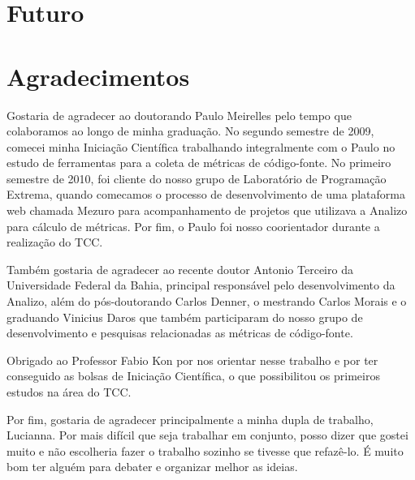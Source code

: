 \documentclass[a4paper, 11pt]{article}
\begin{document}
\section{Futuro}

\section{Agradecimentos}
Gostaria de agradecer ao doutorando Paulo Meirelles pelo tempo que colaboramos ao longo de minha graduação.
No segundo semestre de 2009, comecei minha Iniciação Científica trabalhando integralmente com o Paulo no
estudo de ferramentas para a coleta de métricas de código-fonte. No primeiro semestre de 2010, foi cliente
do nosso grupo de Laboratório de Programação Extrema, quando comecamos o processo de desenvolvimento de uma plataforma web 
chamada Mezuro para acompanhamento de projetos que utilizava a Analizo para cálculo de métricas. Por fim,
o Paulo foi nosso coorientador durante a realização do TCC.

Também gostaria de agradecer ao recente doutor Antonio Terceiro da Universidade Federal da Bahia, principal responsável
pelo desenvolvimento da Analizo, além do pós-doutorando Carlos Denner, o mestrando Carlos Morais e o graduando Vinicius Daros
que também participaram do nosso grupo de desenvolvimento e pesquisas relacionadas as métricas de código-fonte.

Obrigado ao Professor Fabio Kon por nos orientar nesse trabalho e por ter conseguido as bolsas de Iniciação Científica,
o que possibilitou os primeiros estudos na área do TCC.

Por fim, gostaria de agradecer principalmente a minha dupla de trabalho, Lucianna. Por mais difícil que seja
trabalhar em conjunto, posso dizer que gostei muito e não escolheria fazer o trabalho sozinho se tivesse que refazê-lo.
É muito bom ter alguém para debater e organizar melhor as ideias.
\end{document}
